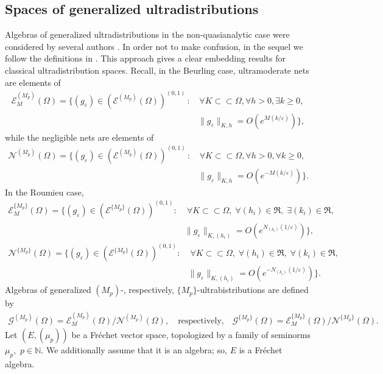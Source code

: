 \documentclass[sn-mathphys,Numbered]{sn-jnl}%
\theoremstyle{thmstyleone}%
\theoremstyle{thmstyletwo}%
\theoremstyle{thmstylethree}%
\begin{document}
\subsection{Spaces of generalized ultradistributions} 
\label{sec 1.4}

Algebras of generalized ultradistributions in the non-quasianalytic case were considered by several authors  \cite{D.V.1,Del-Has-Pil-Val,DHPV}. In order not to make confusion, in the sequel  we follow the definitions in \cite{D.V.1}.  This approach gives a clear embedding results for classical ultradistribution spaces.  Recall, in the Beurling case,  ultramoderate nets are elements of
\begin{align*}
\mathcal{E}^{(M_p)}_M(\Omega) = \Big\{(g_{\varepsilon}) \in (\mathcal{E}^{(M_p)}(\Omega))^{(0,1)}\,:&\, \forall K\subset \subset \Omega, \forall h>0,  \exists k\geq 0, \\
& \| g_{\varepsilon}\|_{K,h} =O(e^{{M}({k}/{\varepsilon})})\Big\},
\end{align*}  
while the negligible nets are elements of
\begin{align*}
\mathcal{N}^{(M_p)}(\Omega) = \Big\{(g_{\varepsilon}) \in  (\mathcal{E}^{(M_p)}(\Omega))^{(0,1)}\,: &\,\forall K\subset \subset \Omega, \forall h>0, \forall k \geq 0,\\
&\|g_{\varepsilon}\|_ {K,h} = O(e^{-{M}({k}/{\varepsilon})} )\Big\}.
\end{align*}  
In the Roumieu case, %
\begin{align*}
\mathcal{E}^{\{M_p\}}_M(\Omega) =  \Big \{(g_{\varepsilon}) \in  (\mathcal{E}^{\{M_p\}}(\Omega))^{(0,1)}: & \; \forall K\subset \subset \Omega, \; \forall (h_i)\in\mathfrak R,   \; \exists (k_i)\in\mathfrak R, \\
 &\| g_{\varepsilon}\|_{K,(h_i)} =O(e^{N_{(k_i)}(1/{\varepsilon})})\Big\},
\end{align*}
\begin{align*}
\mathcal{N}^{\{M_p\}}(\Omega) =  \Big\{(g_{\varepsilon}) \in  (\mathcal{E}^{\{M_p\}}(\Omega))^{(0,1)}: & \; \forall K\subset \subset \Omega, \; \forall (h_i)\in\mathfrak R, \;  \forall (k_i)\in\mathfrak R,\\
&   \| g_{\varepsilon}\|_{K,(h_i)} =O(e^{-N_{(k_i)}(1/{\varepsilon})})\Big\}.
\end{align*} 
Algebras of generalized $(M_p)$-, respectively, $\{M_p\}$-ultrabistributions are defined by 
\begin{align*}
\mathcal{G}^{(M_p)} (\Omega) =   \mathcal{E}^{(M_p)}_M (\Omega) /\mathcal{N}^{(M_p)}(\Omega), \quad \text{respectively,} \quad \mathcal{G}^{\{M_p\}} (\Omega) =   \mathcal{E}^{\{M_p\}}_M (\Omega) /\mathcal{N}^{\{M_p\}}(\Omega).
\end{align*}
Let $(E,(\mu_p))$ be a Fr\'echet vector space,  topologized by a family of seminorms $\mu_p ,$ $p\in  \mathbb N.$ We additionally assume that it is an algebra; so, $E$ is a Fr\'echet algebra. 
\end{document}
